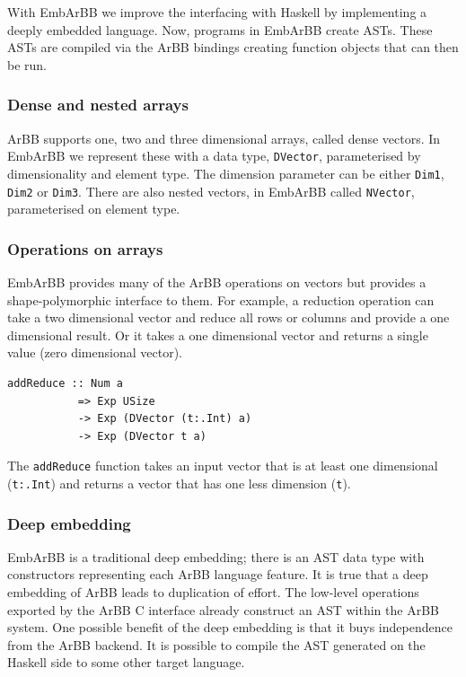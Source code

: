 \documentclass[a4paper]{book}
\begin{document}
With EmbArBB we improve the interfacing with Haskell by implementing a deeply embedded language. 
Now, programs in EmbArBB create ASTs. These ASTs are compiled via the ArBB bindings creating 
function objects that can then be run. 

\subsubsection{Dense and nested arrays}

ArBB supports one, two and three dimensional arrays, called dense vectors. In EmbArBB we 
represent these with a data type, {\tt DVector}, parameterised by dimensionality and 
element type. The dimension parameter can be either {\tt Dim1}, {\tt Dim2} or {\tt Dim3}. 
There are also nested vectors, in EmbArBB called {\tt NVector}, parameterised on element type. 

\subsubsection{Operations on arrays} 

EmbArBB provides many of the ArBB operations on vectors but provides a 
shape-polymorphic interface to them. For example, a reduction operation can take a two  
dimensional vector and reduce all rows or columns and provide a one dimensional result. Or 
it takes a one dimensional vector and returns a single value (zero dimensional vector). 

\begin{verbatim} 
addReduce :: Num a 
           => Exp USize 
           -> Exp (DVector (t:.Int) a) 
           -> Exp (DVector t a) 
\end{verbatim} 

The {\tt addReduce} function takes an input vector that is at least one dimensional 
({\tt t:.Int}) and returns a vector that has one less dimension ({\tt t}).
 
\subsubsection{Deep embedding}

EmbArBB is a traditional deep embedding; there is an AST data type with constructors 
representing each ArBB language feature. It is true that a deep embedding of ArBB 
leads to duplication of effort. The low-level operations exported by the 
ArBB C interface already construct an AST within the ArBB system. One possible benefit 
of the deep embedding is that it buys independence from the ArBB backend. It is possible 
to compile the AST generated on the Haskell side to some other target language. 
\end{document}

